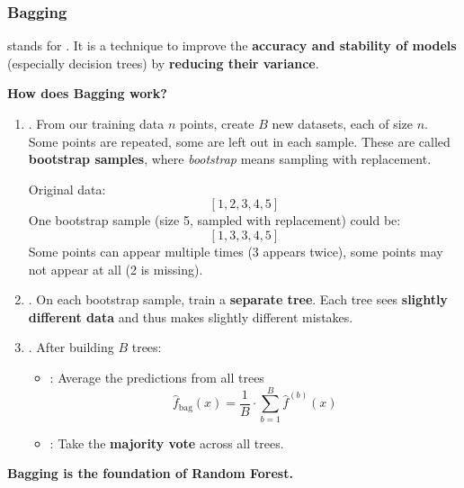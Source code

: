 \subsubsection{Bagging}\label{subsubsection: Bagging}

 stands for . It is a technique to improve the \textbf{accuracy and stability of models} (especially decision trees) by \textbf{reducing their variance}.

\highspace
\begin{flushleft}
    \textcolor{Green3}{ \textbf{How does Bagging work?}}
\end{flushleft}
\begin{enumerate}
    \item {}. From our training data $n$ points, create $B$ new datasets, each of size $n$. Some points are repeated, some are left out in each sample. These are called \textbf{bootstrap samples}, where \emph{bootstrap} means sampling with replacement.

    \begin{examplebox}
        Original data:
        \begin{equation*}
            \left[1, 2, 3, 4, 5\right]
        \end{equation*}
        One bootstrap sample (size 5, sampled with replacement) could be:
        \begin{equation*}
            \left[1, 3, 3, 4, 5\right]
        \end{equation*}
        Some points can appear multiple times (3 appears twice), some points may not appear at all (2 is missing).
    \end{examplebox}


    \item {}. On each bootstrap sample, train a \textbf{separate tree}. Each tree sees \textbf{slightly different data} and thus makes slightly different mistakes.
    
    
    \item {}. After building $B$ trees:
    \begin{itemize}
        \item {}: Average the predictions from all trees
        \begin{equation}
            \hat{f}_{\text{bag}}(x) = \dfrac{1}{B} \cdot \sum_{b=1}^B \hat{f}^{(b)}(x)
        \end{equation}
        \item {}: Take the \textbf{majority vote} across all trees.
    \end{itemize}
\end{enumerate}
\textbf{Bagging is the foundation of Random Forest.}


